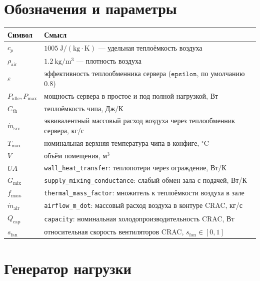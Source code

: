 \documentclass[12pt,a4paper]{article}
\begin{document}
\section{Обозначения и параметры}

\begin{table}[h]
\centering
\begin{tabular}{@{}ll@{}}
\toprule
Символ & Смысл \\
\midrule
$c_p$ & $1005\ \mathrm{J/(kg\cdot K)}$ --- удельная теплоёмкость воздуха \\
$\rho_{\mathrm{air}}$ & $1.2\ \mathrm{kg/m^3}$ --- плотность воздуха \\
$\varepsilon$ & эффективность теплообменника сервера ($\texttt{epsilon}$, по умолчанию $0.8$) \\
$P_{\mathrm{idle}}, P_{\mathrm{max}}$ & мощность сервера в простое и под полной нагрузкой, Вт \\
$C_{\mathrm{th}}$ & теплоёмкость чипа, Дж/К \\
$\dot m_{\mathrm{srv}}$ & эквивалентный массовый расход воздуха через теплообменник сервера, кг/с \\
$T_{\max}$ & номинальная верхняя температура чипа в конфиге, $^\circ\mathrm{C}$ \\
$V$ & объём помещения, м$^3$ \\
$UA$ & \texttt{wall\_heat\_transfer}: теплопотери через ограждение, Вт/К \\
$G_{\mathrm{mix}}$ & \texttt{supply\_mixing\_conductance}: слабый обмен зала с подачей, Вт/К \\
$f_{\mathrm{mass}}$ & \texttt{thermal\_mass\_factor}: множитель к теплоёмкости воздуха в зале \\
$\dot m_{\mathrm{air}}$ & \texttt{airflow\_m\_dot}: массовый расход воздуха в контуре CRAC, кг/с \\
$Q_{\mathrm{cap}}$ & \texttt{capacity}: номинальная холодопроизводительность CRAC, Вт \\
$s_{\mathrm{fan}}$ & относительная скорость вентиляторов CRAC, $s_{\mathrm{fan}}\in[0,1]$ \\
\bottomrule
\end{tabular}
\end{table}

\section{Генератор нагрузки}
\end{document}
